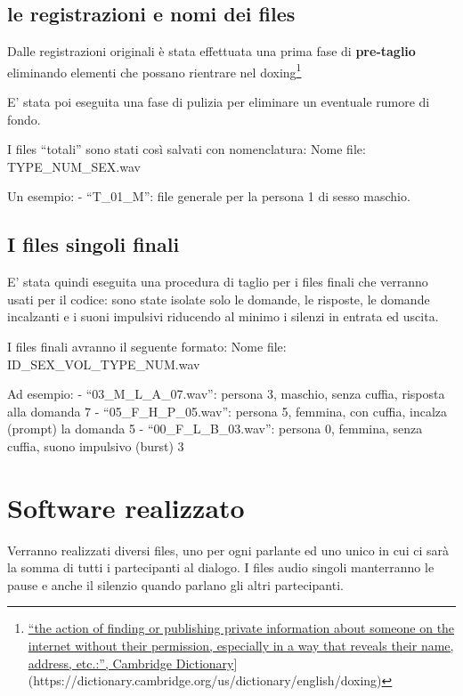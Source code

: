 \documentclass[
]{article}
\begin{document}
\subsection{le registrazioni e nomi dei files}\label{le-registrazioni-e-nomi-dei-files}

Dalle registrazioni originali è stata effettuata una prima fase di \textbf{pre-taglio} eliminando elementi che possano rientrare nel doxing\footnote{\href{\%5Bhttps://www.}{``the action of finding or publishing private information about someone on the internet without their permission, especially in a way that reveals their name, address, etc.:'', Cambridge Dictionary}{]}(https://dictionary.cambridge.org/us/dictionary/english/doxing)}

E' stata poi eseguita una fase di pulizia per eliminare un eventuale rumore di fondo.

I files ``totali'' sono stati così salvati con nomenclatura: Nome file: TYPE\_NUM\_SEX.wav

Un esempio: - ``T\_01\_M'': file generale per la persona 1 di sesso maschio.

\subsection{I files singoli finali}\label{i-files-singoli-finali}

E' stata quindi eseguita una procedura di taglio per i files finali che verranno usati per il codice: sono state isolate solo le domande, le risposte, le domande incalzanti e i suoni impulsivi riducendo al minimo i silenzi in entrata ed uscita.

I files finali avranno il seguente formato: Nome file: ID\_SEX\_VOL\_TYPE\_NUM.wav

Ad esempio: - ``03\_M\_L\_A\_07.wav'': persona 3, maschio, senza cuffia, risposta alla domanda 7 - ``05\_F\_H\_P\_05.wav'': persona 5, femmina, con cuffia, incalza (prompt) la domanda 5 - ``00\_F\_L\_B\_03.wav'': persona 0, femmina, senza cuffia, suono impulsivo (burst) 3

\section{Software realizzato}\label{software-realizzato}

Verranno realizzati diversi files, uno per ogni parlante ed uno unico in cui ci sarà la somma di tutti i partecipanti al dialogo. I files audio singoli manterranno le pause e anche il silenzio quando parlano gli altri partecipanti.
\end{document}
